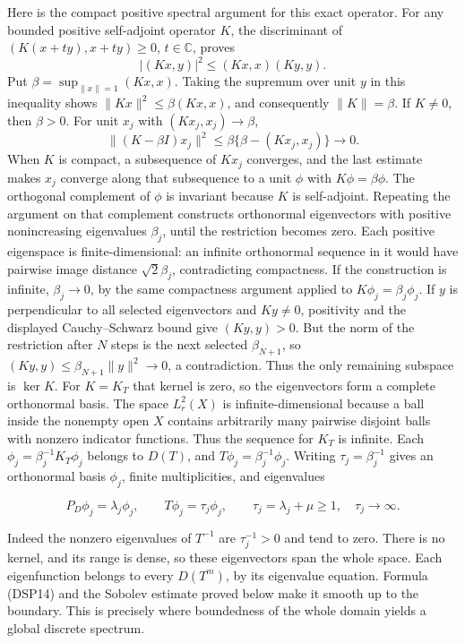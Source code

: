 \documentclass[
  11pt,
]{article}
\begin{document}
Here is the compact positive spectral argument for this exact operator.
For any bounded positive self-adjoint operator \(K\), the discriminant
of \((K(x+t y),x+t y)\geq0\), \(t\in\mathbb C\), proves \[
 |(Kx,y)|^2\leq(Kx,x)(Ky,y).
\] Put \(\beta=\sup_{\|x\|=1}(Kx,x)\). Taking the supremum over unit
\(y\) in this inequality shows \(\|Kx\|^2\leq\beta(Kx,x)\), and
consequently \(\|K\|=\beta\). If \(K\neq0\), then \(\beta>0\). For unit
\(x_j\) with \((Kx_j,x_j)\to\beta\), \[
 \|(K-\beta I)x_j\|^2
 \leq\beta\{\beta-(Kx_j,x_j)\}\longrightarrow0.
\] When \(K\) is compact, a subsequence of \(Kx_j\) converges, and the
last estimate makes \(x_j\) converge along that subsequence to a unit
\(\phi\) with \(K\phi=\beta\phi\). The orthogonal complement of \(\phi\)
is invariant because \(K\) is self-adjoint. Repeating the argument on
that complement constructs orthonormal eigenvectors with positive
nonincreasing eigenvalues \(\beta_j\), until the restriction becomes
zero. Each positive eigenspace is finite-dimensional: an infinite
orthonormal sequence in it would have pairwise image distance
\(\sqrt2\beta_j\), contradicting compactness. If the construction is
infinite, \(\beta_j\to0\), by the same compactness argument applied to
\(K\phi_j=\beta_j\phi_j\). If \(y\) is perpendicular to all selected
eigenvectors and \(Ky\neq0\), positivity and the displayed
Cauchy--Schwarz bound give \((Ky,y)>0\). But the norm of the restriction
after \(N\) steps is the next selected \(\beta_{N+1}\), so
\((Ky,y)\leq\beta_{N+1}\|y\|^2\to0\), a contradiction. Thus the only
remaining subspace is \(\ker K\). For \(K=K_T\) that kernel is zero, so
the eigenvectors form a complete orthonormal basis. The space
\(L^2_r(X)\) is infinite-dimensional because a ball inside the nonempty
open \(X\) contains arbitrarily many pairwise disjoint balls with
nonzero indicator functions. Thus the sequence for \(K_T\) is infinite.
Each \(\phi_j=\beta_j^{-1}K_T\phi_j\) belongs to \(D(T)\), and
\(T\phi_j=\beta_j^{-1}\phi_j\). Writing \(\tau_j=\beta_j^{-1}\) gives an
orthonormal basis \(\phi_j\), finite multiplicities, and eigenvalues

\[
 P_D\phi_j=\lambda_j\phi_j,\qquad
 T\phi_j=\tau_j\phi_j,\qquad
 \tau_j=\lambda_j+\mu\geq1,\quad \tau_j\longrightarrow\infty.
 \tag{DSP16}
\]

Indeed the nonzero eigenvalues of \(T^{-1}\) are \(\tau_j^{-1}>0\) and
tend to zero. There is no kernel, and its range is dense, so these
eigenvectors span the whole space. Each eigenfunction belongs to every
\(D(T^m)\), by its eigenvalue equation. Formula (DSP14) and the Sobolev
estimate proved below make it smooth up to the boundary. This is
precisely where boundedness of the whole domain yields a global discrete
spectrum.
\end{document}
